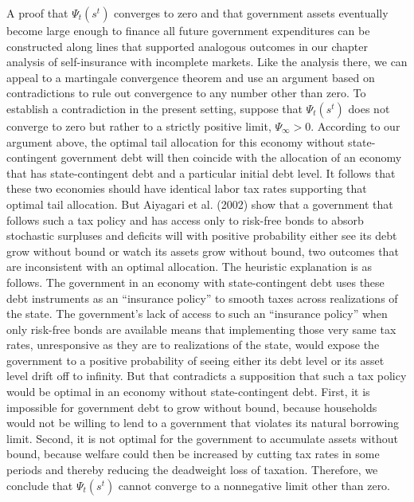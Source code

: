 A proof that $\Psi_t(s^t)$  converges to zero and that government
assets eventually  become large enough to finance all future government
expenditures %
 can be  constructed along
lines that supported analogous outcomes in our chapter
 analysis of  self-insurance with incomplete markets.
Like the analysis there, we can  appeal to a martingale convergence theorem
and use an argument based on contradictions to rule out
convergence to any number other than zero. To establish a
contradiction in the present setting, suppose that $\Psi_t(s^t)$
does not converge to zero but rather to a strictly positive limit,
$\Psi_\infty > 0$. According to our argument above, the optimal
tail allocation for this economy without state-contingent
government debt will then coincide with the allocation of an
economy that has state-contingent debt and a particular initial
debt level. It follows that these two economies should have
identical labor tax rates supporting that optimal tail allocation.
But Aiyagari et al. (2002) show that a government that follows
such a tax policy and has access only to risk-free bonds to absorb
stochastic surpluses and deficits will with positive probability
 either see its debt grow without bound or watch its assets grow without
bound, two outcomes that are  inconsistent with an optimal
allocation. The heuristic explanation is as follows. The
government in an economy with state-contingent debt uses these
debt instruments as an ``insurance policy'' to smooth taxes
across realizations of the state. The government's lack of access to  such an
``insurance policy'' when only risk-free bonds are available
means that implementing those very same tax rates, unresponsive as
they are to realizations of the state, would  expose the
government to a positive probability of seeing either its debt
level or its asset level drift off to infinity. But that
contradicts a supposition that such a tax policy would be optimal
in an economy without state-contingent debt. First, it is
impossible for government debt to grow without bound, because
households would not be willing to lend to a government that
violates its natural borrowing limit. Second, it is not optimal
for the government to accumulate assets without bound, because
welfare could then be increased by cutting tax rates in some
periods and thereby reducing the deadweight loss of
taxation. Therefore, we conclude
that $\Psi_t(s^t)$ cannot converge to a nonnegative limit other
than zero.

